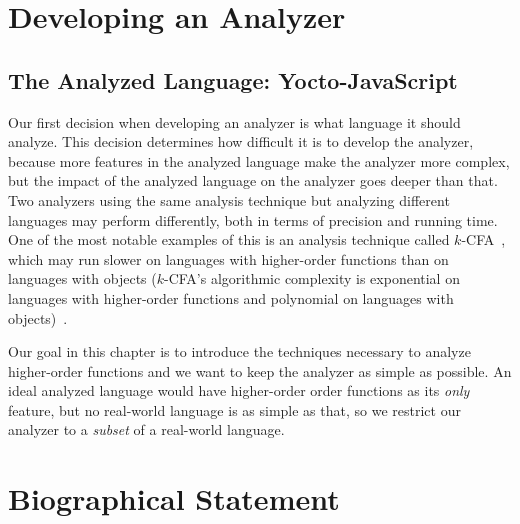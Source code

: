 \documentclass[12pt, oneside]{book}
\begin{document}
\chapter{Developing an Analyzer}


\section{The Analyzed Language: Yocto-JavaScript}

Our first decision when developing an analyzer is what language it should analyze. This decision determines how difficult it is to develop the analyzer, because more features in the analyzed language make the analyzer more complex, but the impact of the analyzed language on the analyzer goes deeper than that. Two analyzers using the same analysis technique but analyzing different languages may perform differently, both in terms of precision and running time. One of the most notable examples of this is an analysis technique called \(k\)-CFA~\cite{k-cfa}, which may run slower on languages with higher-order functions than on languages with objects (\(k\)-CFA’s algorithmic complexity is exponential on languages with higher-order functions and polynomial on languages with objects)~\cite{m-cfa}.

Our goal in this chapter is to introduce the techniques necessary to analyze higher-order functions and we want to keep the analyzer as simple as possible. An ideal analyzed language would have higher-order order functions as its \emph{only} feature, but no real-world language is as simple as that, so we restrict our analyzer to a \emph{subset} of a real-world language.

\appendix


\backmatter




\chapter{Biographical Statement}

\end{document}
